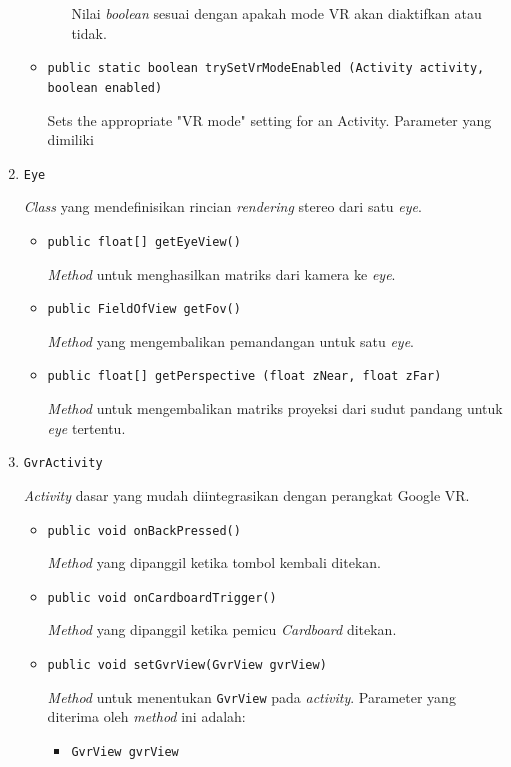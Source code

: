 \begin{enumerate}
\begin{itemize}
\begin{itemize}
					Nilai \textit{boolean} sesuai dengan apakah mode VR akan diaktifkan atau tidak.
				\end{itemize}
				\item \texttt{public static boolean trySetVrModeEnabled (Activity activity, boolean enabled)}
				
				Sets the appropriate "VR mode" setting for an Activity. Parameter yang dimiliki 
			\end{itemize}				
		
		\item \texttt{Eye}
		
		\textit{Class} yang mendefinisikan rincian \textit{rendering} stereo dari satu \textit{eye}. 
			\begin{itemize}
				\item \texttt{public float[] getEyeView()}
				
				\textit{Method} untuk menghasilkan matriks dari kamera ke \textit{eye}.
				\item \texttt{public FieldOfView getFov()}
				
				\textit{Method} yang mengembalikan pemandangan untuk satu \textit{eye}.
				\item \texttt{public float[] getPerspective (float zNear, float zFar)}
				
				\textit{Method} untuk mengembalikan matriks proyeksi dari sudut pandang untuk \textit{eye} tertentu.
			\end{itemize}
		
		\item \texttt{GvrActivity}
		
		\textit{Activity} dasar yang mudah diintegrasikan dengan perangkat Google VR. 
			\begin{itemize}
				\item \texttt{public void onBackPressed()}
				
				\textit{Method} yang dipanggil ketika tombol kembali ditekan.
				\item \texttt{public void onCardboardTrigger()}
				
				\textit{Method} yang dipanggil ketika pemicu \textit{Cardboard} ditekan.
				\item \texttt{public void setGvrView(GvrView gvrView)}
				
				\textit{Method} untuk menentukan \texttt{GvrView} pada \textit{activity}. Parameter yang diterima oleh \textit{method} ini adalah:
				
				\begin{itemize}
					\item \texttt{GvrView gvrView}
					

\end{itemize}
\end{itemize}
\end{enumerate}
